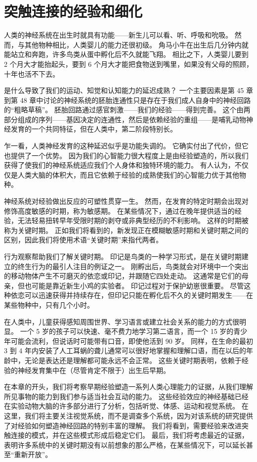 \chapter{突触连接的经验和细化}
人类的神经系统在出生时就具有功能——新生儿可以看、听、呼吸和吮吸。 然而，与其他物种相比，人类婴儿的能力还很初级。 角马小牛在出生后几分钟内就能站立和奔跑，许多鸟类从蛋中孵化后不久就能飞翔。 相比之下，人类婴儿要到 2 个月大才能抬起头，要到 6 个月大才能把食物送到嘴里，如果没有父母的照顾，十年也活不下去。

是什么导致了我们的运动、知觉和认知能力的延迟成熟？ 一个主要因素是第 45 章到第 48 章中讨论的神经系统的胚胎连通性只是存在于我们成人自身中的神经回路的“粗略草稿”。 胚胎回路通过感官刺激——我们的经验——得到完善。 这个由两部分组成的序列——基因决定的连通性，然后是依赖经验的重组——是哺乳动物神经发育的一个共同特征，但在人类中，第二阶段特别长。

乍一看，人类神经发育的这种延迟似乎是功能失调的。 它确实付出了代价，但它也提供了一个优势。 因为我们的心智能力很大程度上是由经验塑造的，所以我们获得了使我们的神经系统适应我们个人身体和独特环境的能力。 有人认为，不仅仅是人类大脑的体积大，而且它依赖于经验的成熟使我们的心智能力优于其他物种。

神经系统对经验做出反应的可塑性贯穿一生。 然而，在发育的特定时期会出现对修饰高度敏感的时期，称为敏感期。 在某些情况下，通过在晚年提供适当的经验，无法轻易扭转早年受限时期的剥夺或非典型经历的不利影响。 这样的时期被称为关键时期。 正如我们将看到的，新发现正在模糊敏感时期和关键时期之间的区别，因此我们将使用术语“关键时期”来指代两者。

行为观察帮助我们了解关键时期。 印记是鸟类的一种学习形式，是在关键时期建立的终生行为的最引人注目的例证之一。 刚孵出后，鸟类就会对环境中一个突出的移动物体产生不可磨灭的依恋或印记，并跟随它四处走动。 这通常是它们的母亲，但也可能是靠近新生小鸡的实验者。 印记过程对于保护幼崽很重要。 尽管这种依恋可以迅速获得并持续存在，但印记只能在孵化后不久的关键时期发生——在某些物种中，只有几个小时。

在人类中，儿童获得感知周围世界、学习语言或建立社会关系的能力的方式很明显。 一个 5 岁的孩子可以快速、毫不费力地学习第二语言，而一个 15 岁的青少年可能会流利，但说话时可能带有口音，即使他活到 90 岁。 同样，在生命的最初 3 到 4 年内安装了人工耳蜗的聋儿通常可以很好地掌握和理解口语，而在以后的年龄中，无论是表达还是理解都可能永远不会正常。 这些关键时期表明，依赖于经验的神经发育集中在（尽管肯定不限于）出生后早期。

在本章的开头，我们将考察早期经验塑造一系列人类心理能力的证据，从我们理解所见事物的能力到我们参与适当社会互动的能力。 这些经验效应的神经基础已经在实验动物大脑的许多部分进行了分析，包括听觉、体感、运动和视觉系统。 在这里，我们将主要关注视觉系统，而不是调查多个系统，因为对该系统的研究提供了对经验如何塑造神经回路的特别丰富的理解。 我们将看到，需要经验来改进突触连接的模式，并在这些模式形成后稳定它们。 最后，我们将考虑最近的证据，表明许多系统中的关键时期没有以前想象的那么严格，在某些情况下，可以延长甚至“重新开放”。

